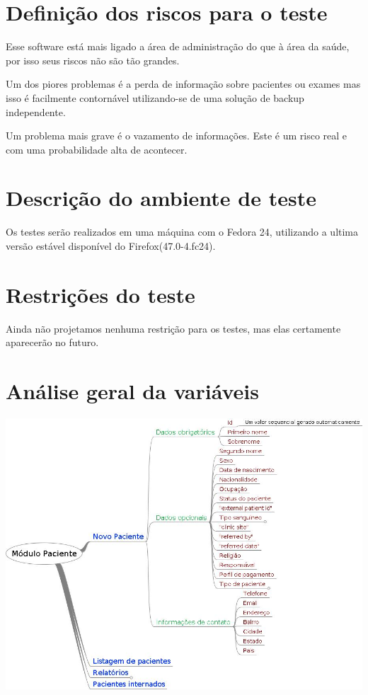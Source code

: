 \section*{Definição dos riscos para o teste}
Esse software está mais ligado a área de administração do que à área da saúde,
por isso seus riscos não são tão grandes.

Um dos piores problemas é a perda de informação sobre pacientes ou exames mas
isso é facilmente contornável utilizando-se de uma solução de backup
independente.

Um problema mais grave é o vazamento de informações. Este é um risco real e com
uma probabilidade alta de acontecer.

\section*{Descrição do ambiente de teste}
Os testes serão realizados em uma máquina com o Fedora 24, utilizando a ultima
versão estável disponível do Firefox(47.0-4.fc24).

\section*{Restrições do teste}
Ainda não projetamos nenhuma restrição para os testes, mas elas certamente
aparecerão no futuro.

\section*{Análise geral da variáveis}
\includegraphics[scale=0.5]{map.jpeg}%

